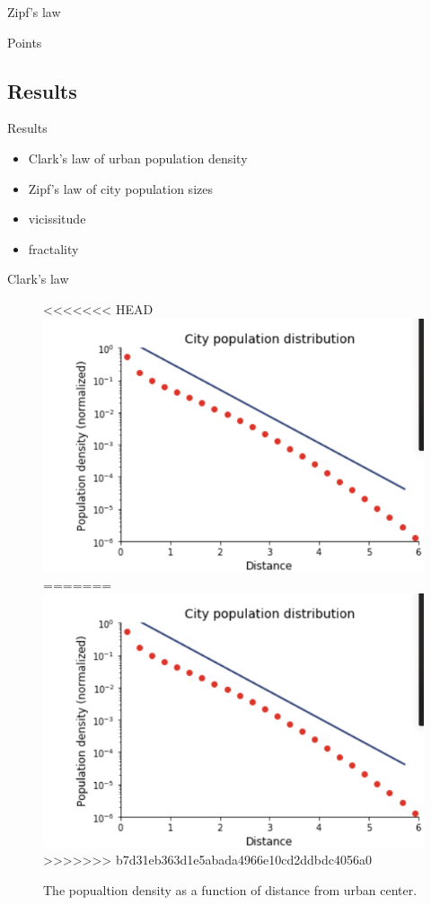 \documentclass{beamer}
\begin{document}
\begin{frame}{Zipf's law}
\begin{frame}{Points}
\end{frame}

\subsection{Results}
\begin{frame}{Results}
  \begin{itemize}
    \item Clark's law of urban population density
    \item Zipf's law of city population sizes
    \item vicissitude
    \item fractality
  \end{itemize}
\end{frame}

\begin{frame}{Clark's law}
  \begin{figure}
<<<<<<< HEAD
    \includegraphics[width = 0.8\linewidth]{pics/clark.PNG}
=======
    \includegraphics[width = 0.8\linewidth]{pics/clark.png}
>>>>>>> b7d31eb363d1e5abada4966e10cd2ddbdc4056a0
    \caption{The popualtion density as a function of distance from urban center.}
  \end{figure}
\end{frame}


\end{frame}
\end{document}
